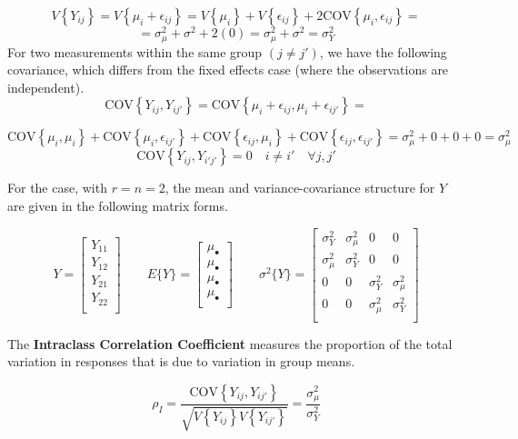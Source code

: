 \documentclass[
]{book}
\begin{document}
\[
V\left\{Y_{ij}\right\}=V\left\{\mu_i+\epsilon_{ij}\right\}=
V\left\{\mu_i\right\} + V\left\{\epsilon_{ij}\right\}
+2\mbox{COV}\left\{\mu_i,\epsilon_{ij}\right\}=\]
\[=\sigma_{\mu}^2+\sigma^2+2(0)
=\sigma_{\mu}^2+\sigma^2=\sigma_Y^2
\] For two measurements within the same group \((j \ne j')\), we have
the following covariance, which differs from the fixed effects case
(where the observations are independent). \[
\mbox{COV}\left\{Y_{ij},Y_{ij'}\right\} = 
\mbox{COV}\left\{\mu_i+\epsilon_{ij},\mu_i+\epsilon_{ij'}\right\} =\]

\[
\mbox{COV}\left\{\mu_i,\mu_i\right\} +
\mbox{COV}\left\{\mu_i,\epsilon_{ij'}\right\} +
\mbox{COV}\left\{\epsilon_{ij},\mu_i\right\} +
\mbox{COV}\left\{\epsilon_{ij},\epsilon_{ij'}\right\} = \sigma_{\mu}^2+0+0+0=\sigma_{\mu}^2
\] \[
\mbox{COV}\left\{Y_{ij},Y_{i'j'}\right\} =0 \quad i \neq i' \quad \forall j,j'
\]

For the case, with \(r=n=2\), the mean and variance-covariance structure
for \(Y\) are given in the following matrix forms.

\[
Y=\begin{bmatrix}
Y_{11} \\ Y_{12} \\ Y_{21} \\ Y_{22} \\
\end{bmatrix} 
\qquad 
E\{Y\} =\begin{bmatrix}
\mu_{\bullet} \\
\mu_{\bullet} \\
\mu_{\bullet} \\
\mu_{\bullet} \\
\end{bmatrix}
\qquad
\sigma^2\{Y\} =\begin{bmatrix}
\sigma_Y^2 & \sigma_{\mu}^2 & 0 & 0 \\
\sigma_{\mu}^2 & \sigma_Y^2 & 0 & 0 \\
0 & 0 & \sigma_Y^2 & \sigma_{\mu}^2 \\
0 & 0 & \sigma_{\mu}^2 & \sigma_Y^2 \\
\end{bmatrix}
\]

The \textbf{Intraclass Correlation Coefficient} measures the proportion
of the total variation in responses that is due to variation in group
means.

\[
\rho_I = \frac{\mbox{COV}\left\{Y_{ij},Y_{ij'}\right\}}{
 \sqrt{V\left\{Y_{ij}\right\}V\left\{Y_{ij'}\right\}}}=
 \frac{\sigma_{\mu}^2}{\sigma_Y^2}
\]
\end{document}
